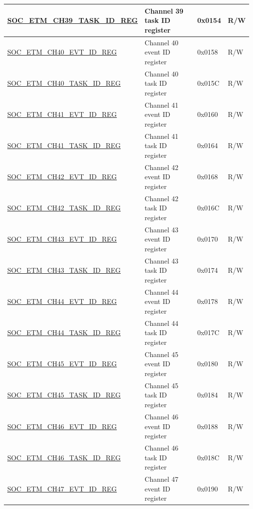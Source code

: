 \begin{longtable}{ | p{6cm} | p{6.2cm} | p{1.3cm} | p{2cm} | }
\hyperref[regdesc:SOCETMCHNTASKIDREG]{SOC\_ETM\_CH39\_TASK\_ID\_REG} & Channel 39 task ID register & 0x0154 & R/W \\ \hline
\hyperref[regdesc:SOCETMCHNEVTIDREG]{SOC\_ETM\_CH40\_EVT\_ID\_REG} & Channel 40 event ID register & 0x0158 & R/W \\ \hline
\hyperref[regdesc:SOCETMCHNTASKIDREG]{SOC\_ETM\_CH40\_TASK\_ID\_REG} & Channel 40 task ID register & 0x015C & R/W \\ \hline
\hyperref[regdesc:SOCETMCHNEVTIDREG]{SOC\_ETM\_CH41\_EVT\_ID\_REG} & Channel 41 event ID register & 0x0160 & R/W \\ \hline
\hyperref[regdesc:SOCETMCHNTASKIDREG]{SOC\_ETM\_CH41\_TASK\_ID\_REG} & Channel 41 task ID register & 0x0164 & R/W \\ \hline
\hyperref[regdesc:SOCETMCHNEVTIDREG]{SOC\_ETM\_CH42\_EVT\_ID\_REG} & Channel 42 event ID register & 0x0168 & R/W \\ \hline
\hyperref[regdesc:SOCETMCHNTASKIDREG]{SOC\_ETM\_CH42\_TASK\_ID\_REG} & Channel 42 task ID register & 0x016C & R/W \\ \hline
\hyperref[regdesc:SOCETMCHNEVTIDREG]{SOC\_ETM\_CH43\_EVT\_ID\_REG} & Channel 43 event ID register & 0x0170 & R/W \\ \hline
\hyperref[regdesc:SOCETMCHNTASKIDREG]{SOC\_ETM\_CH43\_TASK\_ID\_REG} & Channel 43 task ID register & 0x0174 & R/W \\ \hline
\hyperref[regdesc:SOCETMCHNEVTIDREG]{SOC\_ETM\_CH44\_EVT\_ID\_REG} & Channel 44 event ID register & 0x0178 & R/W \\ \hline
\hyperref[regdesc:SOCETMCHNTASKIDREG]{SOC\_ETM\_CH44\_TASK\_ID\_REG} & Channel 44 task ID register & 0x017C & R/W \\ \hline
\hyperref[regdesc:SOCETMCHNEVTIDREG]{SOC\_ETM\_CH45\_EVT\_ID\_REG} & Channel 45 event ID register & 0x0180 & R/W \\ \hline
\hyperref[regdesc:SOCETMCHNTASKIDREG]{SOC\_ETM\_CH45\_TASK\_ID\_REG} & Channel 45 task ID register & 0x0184 & R/W \\ \hline
\hyperref[regdesc:SOCETMCHNEVTIDREG]{SOC\_ETM\_CH46\_EVT\_ID\_REG} & Channel 46 event ID register & 0x0188 & R/W \\ \hline
\hyperref[regdesc:SOCETMCHNTASKIDREG]{SOC\_ETM\_CH46\_TASK\_ID\_REG} & Channel 46 task ID register & 0x018C & R/W \\ \hline
\hyperref[regdesc:SOCETMCHNEVTIDREG]{SOC\_ETM\_CH47\_EVT\_ID\_REG} & Channel 47 event ID register & 0x0190 & R/W \\ \hline

\end{longtable}
